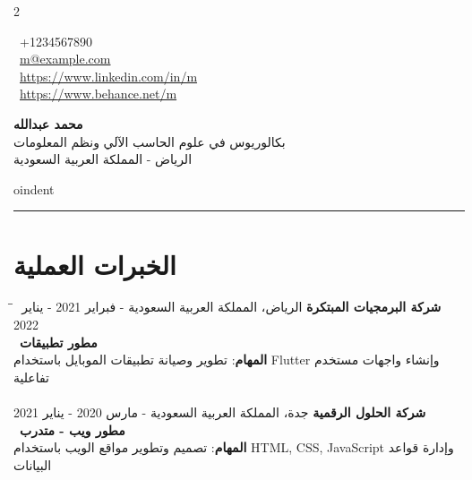 \documentclass[a4paper,10pt]{article} %
\begin{document}
\begin{RTL} %

\begin{multicols}{2} %
\begin{flushleft} %
    \vspace{0.2cm}
    \faPhone\ +1234567890 \\
    \faEnvelope\ \href{mailto:ali.fakeeh@example.com}{m@example.com} \\
    \faLinkedin\ \href{https://www.linkedin.com/in/alifakeeh}{https://www.linkedin.com/in/m} \\
    \faBehance\ \href{https://www.behance.net/alifakeeh}{https://www.behance.net/m} \\
\end{flushleft}
\begin{flushright} %
    {\LARGE \textbf{محمد عبدالله}}\\
    \vspace{0.2cm}
    بكالوريوس في علوم الحاسب الآلي ونظم المعلومات \\
    الرياض - المملكة العربية السعودية \\
\end{flushright}
\end{multicols}

\vspace{0.3cm}

oindent\rule{\textwidth}{1pt} %
\vspace{0.3cm}

\section*{الخبرات العملية}
\vspace{0.5cm} %
\begin{tabbing}
    \hspace{8cm} \= \hspace{5cm} \= \kill
    \textbf{شركة البرمجيات المبتكرة} \> الرياض، المملكة العربية السعودية - فبراير 2021 - يناير 2022 \\
    \ \textbf{مطور تطبيقات} \\
    \textbf{المهام}: تطوير وصيانة تطبيقات الموبايل باستخدام Flutter وإنشاء واجهات مستخدم تفاعلية \> \\ \\
    \textbf{شركة الحلول الرقمية} \> جدة، المملكة العربية السعودية - مارس 2020 - يناير 2021 \\
    \ \textbf{مطور ويب - متدرب} \\
    \textbf{المهام}: تصميم وتطوير مواقع الويب باستخدام HTML, CSS, JavaScript وإدارة قواعد البيانات \> \\
\end{tabbing}


\end{RTL}
\end{document}
